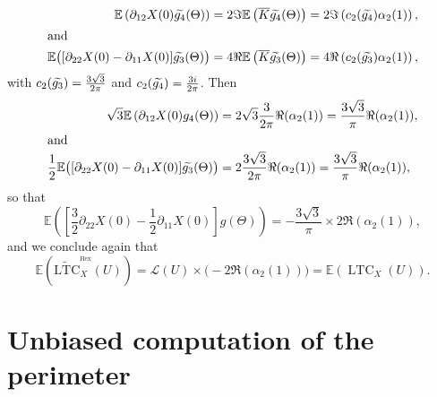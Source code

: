 \documentclass[10pt]{amsart}
\theoremstyle{definition}\newtheorem{defi}[theo]{Definition}\newtheorem{rema}[theo]{Remark}\newtheorem{exam}[theo]{Example}\newtheorem{exem}[theo]{Example}\newtheorem{nota}[theo]{Notation}
\newcommand{\E}{\mathbb{E}}
\DeclareMathOperator{\LTC}{LTC}
\DeclareMathOperator{\Hex}{Hex}
\newcommand{\tLTC}{\widetilde{\mathrm{LTC}}}
\newcommand{\calL}{\mathcal{L}}
\let\oldtilde\tilde
\renewcommand*{\tilde}[1]{\mathchoice{\widetilde{#1}}{\widetilde{#1}}{\oldtilde{#1}}{\oldtilde{#1}}}
\begin{document}
\begin{align*}
\E\left(\partial_{12}X(0)\tilde{g_4}(\Theta)\right) &=2\Im \E\left(\overline{K}\tilde{g_4}(\Theta)\right)
=2 \Im \left(c_2(\tilde{g_4})\alpha_2(1)\right),
\\
\intertext{and}
\E\big([\partial_{22}X(0)-\partial_{11}X(0)]\tilde{g_3}(\Theta)\big) &=4\Re \E\left(\overline{K}\tilde{g_3}(\Theta)\right)
=4 \Re \left(c_2(\tilde{g_3})\alpha_2(1)\right),
\end{align*}
with $c_2(\tilde{g_3})=\frac{3\sqrt{3}}{2\pi}$ and $c_2(\tilde{g_4})=\frac{3i}{2\pi}$. Then
\begin{align*}
\sqrt{3}\E\left(\partial_{12}X(0)g_4(\Theta)\right) &=2\sqrt{3}\frac{3}{2\pi}\Re(\alpha_2(1))=\frac{3\sqrt{3}}{\pi}\Re(\alpha_2(1)),
\\
\intertext{and}
\frac{1}{2}\E\big([\partial_{22}X(0)-\partial_{11}X(0)]\tilde{g_3}(\Theta)\big) &=2\frac{3\sqrt{3}}{2\pi}\Re(\alpha_2(1))=\frac{3\sqrt{3}}{\pi}\Re(\alpha_2(1)),
\end{align*}
so that
\[
\E\left(\left[\frac{3}{2}\partial_{22}X(0)
-\frac{1}{2}\partial_{11}X(0)\right]g(\Theta)\right)=-\frac{3\sqrt{3}}{\pi}\times 2\Re(\alpha_2(1)),
\]
and we conclude again that
\[
\E\left(\tLTC^{^{\Hex}}_{X}(U)\right)={\calL}(U)\times \big(-2\Re(\alpha_2(1))\big)=\E\left(\LTC_X(U)\right).
\]

\section{Unbiased computation of the perimeter}\label{unbiased:app}
\end{document}
